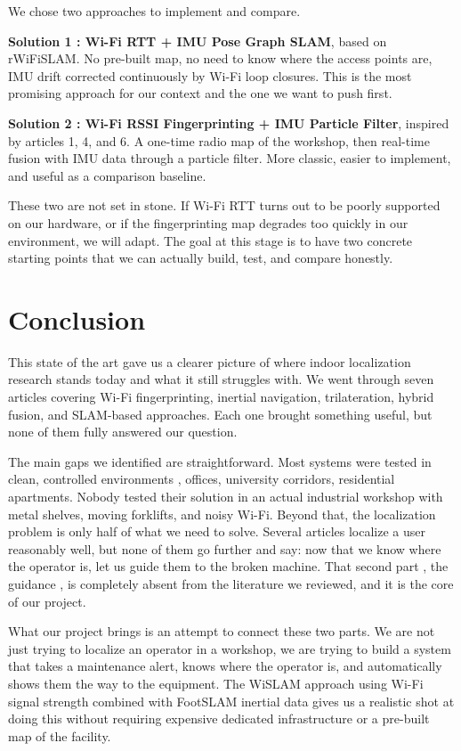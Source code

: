 \documentclass{ipgpmaster}
\begin{document}
We chose two approaches to implement and compare.

\textbf{Solution 1 : Wi-Fi RTT + IMU Pose Graph SLAM}, based on rWiFiSLAM. No pre-built map, no need to know where the access points are, IMU drift corrected continuously by Wi-Fi loop closures. This is the most promising approach for our context and the one we want to push first.

\textbf{Solution 2 : Wi-Fi RSSI Fingerprinting + IMU Particle Filter}, inspired by articles 1, 4, and 6. A one-time radio map of the workshop, then real-time fusion with IMU data through a particle filter. More classic, easier to implement, and useful as a comparison baseline.

These two are not set in stone. If Wi-Fi RTT turns out to be poorly supported on our hardware, or if the fingerprinting map degrades too quickly in our environment, we will adapt. The goal at this stage is to have two concrete starting points that we can actually build, test, and compare honestly.

 
 
\section{Conclusion}

This state of the art gave us a clearer picture of where indoor localization research stands today and what it still struggles with. We went through seven articles covering Wi-Fi fingerprinting, inertial navigation, trilateration, hybrid fusion, and SLAM-based approaches. Each one brought something useful, but none of them fully answered our question.

The main gaps we identified are straightforward. Most systems were tested in clean, controlled environments ,  offices, university corridors, residential apartments. Nobody tested their solution in an actual industrial workshop with metal shelves, moving forklifts, and noisy Wi-Fi. Beyond that, the localization problem is only half of what we need to solve. Several articles localize a user reasonably well, but none of them go further and say: now that we know where the operator is, let us guide them to the broken machine. That second part ,  the guidance ,  is completely absent from the literature we reviewed, and it is the core of our project.

What our project brings is an attempt to connect these two parts. We are not just trying to localize an operator in a workshop, we are trying to build a system that takes a maintenance alert, knows where the operator is, and automatically shows them the way to the equipment. The WiSLAM approach using Wi-Fi signal strength combined with FootSLAM inertial data gives us a realistic shot at doing this without requiring expensive dedicated infrastructure or a pre-built map of the facility.
\end{document}
